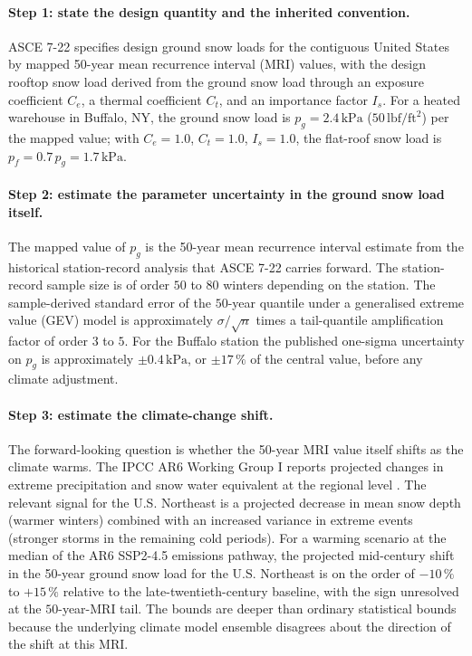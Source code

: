 \paragraph{Step 1: state the design quantity and the inherited
convention.}
ASCE 7-22 \cite{ch09-std:asce-7-22} specifies design ground snow
loads for the contiguous United States by mapped 50-year mean
recurrence interval (MRI) values, with the design rooftop snow
load derived from the ground snow load through an exposure
coefficient $C_{e}$, a thermal coefficient $C_{t}$, and an
importance factor $I_{s}$. For a heated warehouse in Buffalo, NY,
the ground snow load is $p_{g} = 2.4 \,\si{\kilo\pascal}$ ($50 \,
\text{lbf}/\text{ft}^{2}$) per the mapped value; with $C_{e} =
1.0$, $C_{t} = 1.0$, $I_{s} = 1.0$, the flat-roof snow load is
$p_{f} = 0.7 \, p_{g} = 1.7 \,\si{\kilo\pascal}$.

\paragraph{Step 2: estimate the parameter uncertainty in the
ground snow load itself.}
The mapped value of $p_{g}$ is the 50-year mean recurrence
interval estimate from the historical station-record analysis
that ASCE 7-22 carries forward. The station-record sample size is
of order $50$ to $80$ winters depending on the station. The
sample-derived standard error of the $50$-year quantile under a
generalised extreme value (GEV) model is approximately $\sigma /
\sqrt{n}$ times a tail-quantile amplification factor of order
$3$ to $5$. For the Buffalo station the published one-sigma
uncertainty on $p_{g}$ is approximately $\pm 0.4 \,\si{\kilo
\pascal}$, or $\pm 17\,\%$ of the central value, before any
climate adjustment.

\paragraph{Step 3: estimate the climate-change shift.}
The forward-looking question is whether the 50-year MRI value
itself shifts as the climate warms. The IPCC AR6 Working Group I
reports projected changes in extreme precipitation and snow water
equivalent at the regional level
\cite{ch09-std:ipcc-ar6-wg1}. The relevant signal for the U.S.
Northeast is a projected decrease in mean snow depth (warmer
winters) combined with an increased variance in extreme events
(stronger storms in the remaining cold periods). For a warming
scenario at the median of the AR6 SSP2-4.5 emissions pathway, the
projected mid-century shift in the 50-year ground snow load for
the U.S. Northeast is on the order of $-10\,\%$ to $+15\,\%$
relative to the late-twentieth-century baseline, with the sign
unresolved at the $50$-year-MRI tail. The bounds are deeper than
ordinary statistical bounds because the underlying climate model
ensemble disagrees about the direction of the shift at this MRI.

